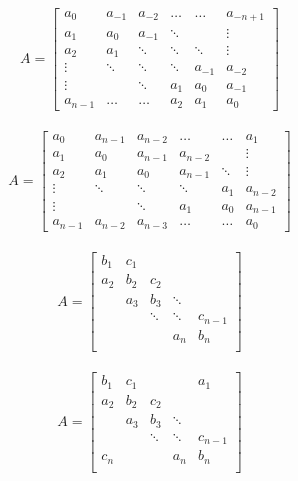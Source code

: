 \documentclass[a4paper,10pt]{article}
\date{}  %
\begin{document}
\begin{align}
    A = \begin{bmatrix}
        a_{0} & a_{-1} & a_{-2} & \ldots & \ldots & a_{-n+1} \\
        a_{1} & a_{0} & a_{-1}  & \ddots & & \vdots \\
        a_{2} & a_{1} & \ddots & \ddots & \ddots & \vdots \\
        \vdots & \ddots & \ddots & \ddots & a_{-1} & a_{-2} \\
        \vdots & & \ddots & a_{1} & a_{0} & a_{-1} \\
        a_{n-1} & \ldots & \ldots & a_{2} & a_{1} & a_{0}
    \end{bmatrix}
\end{align}

\begin{align}
    A = \begin{bmatrix}
        a_{0} & a_{n-1} & a_{n-2} & \ldots & \ldots & a_{1} \\
        a_{1} & a_{0} & a_{n-1} & a_{n-2} & & \vdots \\
        a_{2} & a_{1} & a_{0} & a_{n-1} & \ddots & \vdots \\
        \vdots & \ddots & \ddots & \ddots & a_{1} & a_{n-2} \\
        \vdots & & \ddots & a_{1} & a_{0} & a_{n-1} \\
        a_{n-1}  & a_{n-2} & a_{n-3} & \ldots & \ldots & a_{0}
    \end{bmatrix}
\end{align}

\begin{align}
    A = \begin{bmatrix}
        b_{1} & c_{1} & & & \\
        a_{2} & b_{2} & c_{2} & & \\
        & a_{3} & b_{3} & \ddots & \\
        & & \ddots & \ddots & c_{n-1}\\
        & & & a_{n} & b_{n} \\
    \end{bmatrix}
\end{align}

\begin{align}
    A = \begin{bmatrix}
        b_{1} & c_{1} & & & a_{1}\\
        a_{2} & b_{2} & c_{2} & & \\
        & a_{3} & b_{3} & \ddots & \\
        & & \ddots & \ddots & c_{n-1}\\
        c_{n} & & & a_{n} & b_{n} \\
    \end{bmatrix}
\end{align}
\end{document}
